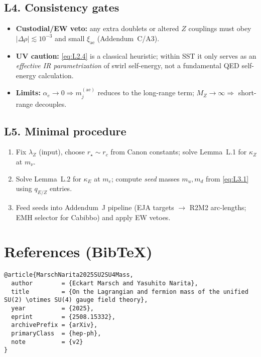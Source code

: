 \documentclass[11pt]{article}
\begin{document}
  \subsection*{L4. Consistency gates}

  \begin{itemize}
  \item \textbf{Custodial/EW veto:} any extra doublets or altered $Z$ couplings must obey $|\Delta\rho|\lesssim 10^{-3}$ and small $\xi_{\text{ae}}$ (Addendum~C/A3).
  \item \textbf{UV caution:} \eqref{eq:L2.4} is a classical heuristic; within SST it only serves as an \emph{effective IR parametrization} of swirl self-energy, not a fundamental QED self-energy calculation.
  \item \textbf{Limits:} $\alpha_e\!\to\!0 \Rightarrow m_j^{(\text{ae})}$ reduces to the long-range term; $M_Z\!\to\!\infty \Rightarrow$ short-range decouples.
  \end{itemize}

  \subsection*{L5. Minimal procedure}

  \begin{enumerate}
  \item Fix $\lambda_Z$ (input), choose $r_\star\sim r_c$ from Canon constants; solve Lemma~L.1 for $\kappa_Z$ at $m_\nu$.
  \item Solve Lemma~L.2 for $\kappa_E$ at $m_e$; compute \emph{seed} masses $m_u,m_d$ from \eqref{eq:L3.1} using $q_{E/Z}$ entries.
  \item Feed seeds into Addendum~J pipeline (EJA targets $\to$ R2M2 arc-lengths; EMH selector for Cabibbo) and apply EW vetoes.
  \end{enumerate}

  \section*{References (Bib\TeX)}
  \begin{verbatim}
@article{MarschNarita2025SU2SU4Mass,
  author        = {Eckart Marsch and Yasuhito Narita},
  title         = {On the Lagrangian and fermion mass of the unified SU(2) \otimes SU(4) gauge field theory},
  year          = {2025},
  eprint        = {2508.15332},
  archivePrefix = {arXiv},
  primaryClass  = {hep-ph},
  note          = {v2}
}
  \end{verbatim}





  \ifdefined\standalonechapter\else
  
  
\end{document}
